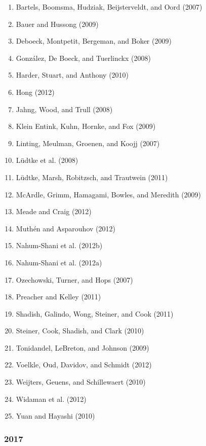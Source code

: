 \documentclass[english,man]{apa6}
\providecommand{\tightlist}{%
  \setlength{\itemsep}{0pt}\setlength{\parskip}{0pt}}
\theoremstyle{definition}
\theoremstyle{definition}
\theoremstyle{definition}
\theoremstyle{remark}
\begin{document}
\begin{enumerate}
\def\labelenumi{\arabic{enumi})}
\tightlist
\item
  Bartels, Boomsma, Hudziak, Beijsterveldt, and Oord (2007)
\item
  Bauer and Hussong (2009)
\item
  Deboeck, Montpetit, Bergeman, and Boker (2009)
\item
  González, De Boeck, and Tuerlinckx (2008)
\item
  Harder, Stuart, and Anthony (2010)
\item
  Hong (2012)
\item
  Jahng, Wood, and Trull (2008)
\item
  Klein Entink, Kuhn, Hornke, and Fox (2009)
\item
  Linting, Meulman, Groenen, and Koojj (2007)
\item
  Lüdtke et al. (2008)
\item
  Lüdtke, Marsh, Robitzsch, and Trautwein (2011)
\item
  McArdle, Grimm, Hamagami, Bowles, and Meredith (2009)
\item
  Meade and Craig (2012)
\item
  Muthén and Asparouhov (2012)
\item
  Nahum-Shani et al. (2012b)
\item
  Nahum-Shani et al. (2012a)
\item
  Ozechowski, Turner, and Hops (2007)
\item
  Preacher and Kelley (2011)
\item
  Shadish, Galindo, Wong, Steiner, and Cook (2011)
\item
  Steiner, Cook, Shadish, and Clark (2010)
\item
  Tonidandel, LeBreton, and Johnson (2009)
\item
  Voelkle, Oud, Davidov, and Schmidt (2012)
\item
  Weijters, Geuens, and Schillewaert (2010)
\item
  Widaman et al. (2012)
\item
  Yuan and Hayashi (2010)
\end{enumerate}

\subsubsection{2017}\label{section-35}
\end{document}

